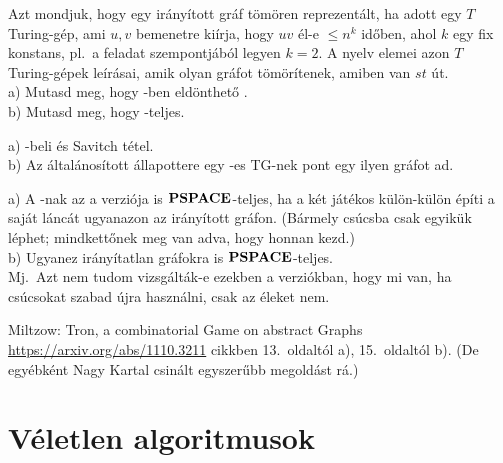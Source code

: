 \begin{Exercise}[counter={sorszam}, difficulty=0]
	Azt mondjuk, hogy egy ir\'any\'itott %
	gr\'af t\"om\"oren reprezent\'alt, ha adott egy $T$ Turing-g\'ep, ami $u,v$ bemenetre ki\'irja, hogy $uv$ \'el-e $\le n^k$ id\H oben, ahol $k$ egy fix konstans, pl.\ a feladat szempontj\'ab\'ol legyen $k=2$. A  nyelv elemei azon $T$ Turing-g\'epek le\'ir\'asai, amik olyan gr\'afot t\"om\"or\'itenek, amiben van $st$ \'ut.\\
	a) Mutasd meg, hogy \PSPACE-ben eld\"onthet\H o .\\
	b) Mutasd meg, hogy  \PSPACE-teljes.
\end{Exercise}	
\begin{Answer}
	a) -beli \'es Savitch t\'etel.\\
	b) Az \'altal\'anos\'itott \'allapottere egy \PSPACE-es TG-nek pont egy ilyen gr\'afot ad.
\end{Answer}



\begin{Exercise}[counter={sorszam}, difficulty=2]
	a) A -nak az a verzi\'oja is $\mbox{\ensuremath{\mathbf{PSPACE}}}$-teljes, ha a k\'et j\'at\'ekos k\"ul\"on-k\"ul\"on \'ep\'iti a saj\'at l\'anc\'at ugyanazon az ir\'any\'itott gr\'afon.
	(B\'armely cs\'ucsba csak egyik\"uk l\'ephet; mindkett\H onek meg van adva, hogy honnan kezd.)\\
	b) Ugyanez ir\'any\'itatlan gr\'afokra is $\mbox{\ensuremath{\mathbf{PSPACE}}}$-teljes.\\
	Mj.\ Azt nem tudom vizsg\'alt\'ak-e ezekben a verzi\'okban, hogy mi van, ha cs\'ucsokat szabad \'ujra haszn\'alni, csak az \'eleket nem.
\end{Exercise}	
\begin{Answer}
	Miltzow: Tron, a combinatorial Game on abstract Graphs \url{https://arxiv.org/abs/1110.3211} cikkben 13.~oldalt\'ol a), 15.\ oldalt\'ol b). (De egy\'ebk\'ent Nagy Kartal csin\'alt egyszer\H ubb megold\'ast r\'a.) 
\end{Answer}











\chapter{Véletlen algoritmusok}


